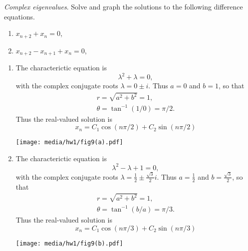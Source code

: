 \documentclass[
    classnum=MATH564,
    classname=MATHEMATICAL\ MODELING,
    due=January\ 28\,\ 2020,
    author=Gabrielle\ Streeter\qquad Hannah\ Wu\qquad\ Minghang\ Li,
    authorshort=Streeter\ \&\ Wu\ \&\ Li,
    teacher= Zachary\ M.\ Boyd,
    hw=1
]{hw-template}
\newenvironment{Figure}
  {\par\medskip\noindent\minipage{\linewidth}}
  {\endminipage\par\medskip}
\begin{document}
\begin{homeworkProblem}
\textit{Complex eigenvalues}. Solve and graph the  solutions to the following
difference equations.
\begin{enumerate}
    \item $x_{n+2} + x_n = 0$,
    \item $x_{n+2} - x_{n+1} + x_n = 0$,
\end{enumerate}

\segline

\solution

\begin{enumerate}
    \item The characterictic equation is \[
        \lambda^2 + \lambda = 0,
    \]
    with the complex conjugate roots $\lambda = 0 \pm i$. Thus $a=0$ and $b=1$,
    so that \[
        \begin{aligned}
            r = \sqrt{a^2 + b^2} = 1,\\
            \theta = \tan^{-1}(1/0) = \pi/2.
        \end{aligned}
    \]
    Thus the real-valued solution is \[
        x_n = C_1 \cos (n\pi/2) + C_2 \sin (n\pi/2)
    \]
    \begin{Figure}
        \centering
        \texttt{[image: media/hw1/fig9(a).pdf]}
    \end{Figure}

    \item The characterictic equation is \[
        \lambda^2 - \lambda + 1 = 0,
    \]
    with the complex conjugate roots
    $\lambda = \frac{1}{2} \pm \frac{\sqrt{3}}{2}i$.
    Thus $a = \frac{1}{2}$ and $b = \frac{\sqrt{3}}{2}$,
    so that \[
        \begin{aligned}
            r = \sqrt{a^2 + b^2} = 1,\\
            \theta = \tan^{-1}(b/a) = \pi/3.
        \end{aligned}
    \]
    Thus the real-valued solution is \[
        x_n = C_1 \cos (n\pi/3) + C_2 \sin (n\pi/3)
    \]
    \begin{Figure}
        \centering
        \texttt{[image: media/hw1/fig9(b).pdf]}
    \end{Figure}

\end{enumerate}
\end{homeworkProblem}
\end{document}
